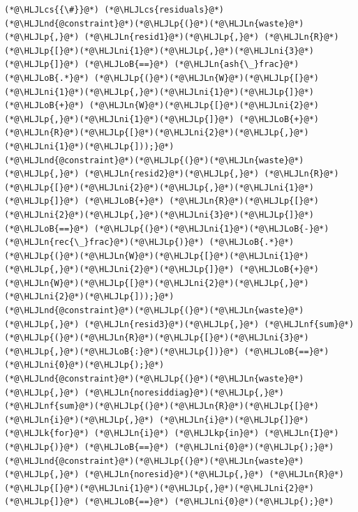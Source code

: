 \documentclass[12pt,a4paper]{article}
\newcommand{\HLJLk}[1]{\textcolor[RGB]{148,91,176}{\textbf{#1}}}
\newcommand{\HLJLkp}[1]{\textcolor[RGB]{148,91,176}{\textbf{#1}}}
\newcommand{\HLJLn}[1]{#1}
\newcommand{\HLJLnd}[1]{\textcolor[RGB]{214,102,97}{#1}}
\newcommand{\HLJLnf}[1]{\textcolor[RGB]{66,102,213}{#1}}
\newcommand{\HLJLni}[1]{\textcolor[RGB]{59,151,46}{#1}}
\newcommand{\HLJLoB}[1]{\textcolor[RGB]{102,102,102}{\textbf{#1}}}
\newcommand{\HLJLp}[1]{#1}
\newcommand{\HLJLcs}[1]{\textcolor[RGB]{153,153,119}{\textit{#1}}}
\begin{document}
\begin{lstlisting}
(*@\HLJLcs{{\#}}@*) (*@\HLJLcs{residuals}@*)
(*@\HLJLnd{@constraint}@*)(*@\HLJLp{(}@*)(*@\HLJLn{waste}@*)(*@\HLJLp{,}@*) (*@\HLJLn{resid1}@*)(*@\HLJLp{,}@*) (*@\HLJLn{R}@*)(*@\HLJLp{[}@*)(*@\HLJLni{1}@*)(*@\HLJLp{,}@*)(*@\HLJLni{3}@*)(*@\HLJLp{]}@*) (*@\HLJLoB{==}@*) (*@\HLJLn{ash{\_}frac}@*) (*@\HLJLoB{.*}@*) (*@\HLJLp{(}@*)(*@\HLJLn{W}@*)(*@\HLJLp{[}@*)(*@\HLJLni{1}@*)(*@\HLJLp{,}@*)(*@\HLJLni{1}@*)(*@\HLJLp{]}@*) (*@\HLJLoB{+}@*) (*@\HLJLn{W}@*)(*@\HLJLp{[}@*)(*@\HLJLni{2}@*)(*@\HLJLp{,}@*)(*@\HLJLni{1}@*)(*@\HLJLp{]}@*) (*@\HLJLoB{+}@*) (*@\HLJLn{R}@*)(*@\HLJLp{[}@*)(*@\HLJLni{2}@*)(*@\HLJLp{,}@*)(*@\HLJLni{1}@*)(*@\HLJLp{]));}@*)
(*@\HLJLnd{@constraint}@*)(*@\HLJLp{(}@*)(*@\HLJLn{waste}@*)(*@\HLJLp{,}@*) (*@\HLJLn{resid2}@*)(*@\HLJLp{,}@*) (*@\HLJLn{R}@*)(*@\HLJLp{[}@*)(*@\HLJLni{2}@*)(*@\HLJLp{,}@*)(*@\HLJLni{1}@*)(*@\HLJLp{]}@*) (*@\HLJLoB{+}@*) (*@\HLJLn{R}@*)(*@\HLJLp{[}@*)(*@\HLJLni{2}@*)(*@\HLJLp{,}@*)(*@\HLJLni{3}@*)(*@\HLJLp{]}@*) (*@\HLJLoB{==}@*) (*@\HLJLp{(}@*)(*@\HLJLni{1}@*)(*@\HLJLoB{-}@*)(*@\HLJLn{rec{\_}frac}@*)(*@\HLJLp{)}@*) (*@\HLJLoB{.*}@*) (*@\HLJLp{(}@*)(*@\HLJLn{W}@*)(*@\HLJLp{[}@*)(*@\HLJLni{1}@*)(*@\HLJLp{,}@*)(*@\HLJLni{2}@*)(*@\HLJLp{]}@*) (*@\HLJLoB{+}@*) (*@\HLJLn{W}@*)(*@\HLJLp{[}@*)(*@\HLJLni{2}@*)(*@\HLJLp{,}@*)(*@\HLJLni{2}@*)(*@\HLJLp{]));}@*)
(*@\HLJLnd{@constraint}@*)(*@\HLJLp{(}@*)(*@\HLJLn{waste}@*)(*@\HLJLp{,}@*) (*@\HLJLn{resid3}@*)(*@\HLJLp{,}@*) (*@\HLJLnf{sum}@*)(*@\HLJLp{(}@*)(*@\HLJLn{R}@*)(*@\HLJLp{[}@*)(*@\HLJLni{3}@*)(*@\HLJLp{,}@*)(*@\HLJLoB{:}@*)(*@\HLJLp{])}@*) (*@\HLJLoB{==}@*) (*@\HLJLni{0}@*)(*@\HLJLp{);}@*)
(*@\HLJLnd{@constraint}@*)(*@\HLJLp{(}@*)(*@\HLJLn{waste}@*)(*@\HLJLp{,}@*) (*@\HLJLn{noresiddiag}@*)(*@\HLJLp{,}@*) (*@\HLJLnf{sum}@*)(*@\HLJLp{(}@*)(*@\HLJLn{R}@*)(*@\HLJLp{[}@*)(*@\HLJLn{i}@*)(*@\HLJLp{,}@*) (*@\HLJLn{i}@*)(*@\HLJLp{]}@*) (*@\HLJLk{for}@*) (*@\HLJLn{i}@*) (*@\HLJLkp{in}@*) (*@\HLJLn{I}@*)(*@\HLJLp{)}@*) (*@\HLJLoB{==}@*) (*@\HLJLni{0}@*)(*@\HLJLp{);}@*)
(*@\HLJLnd{@constraint}@*)(*@\HLJLp{(}@*)(*@\HLJLn{waste}@*)(*@\HLJLp{,}@*) (*@\HLJLn{noresid}@*)(*@\HLJLp{,}@*) (*@\HLJLn{R}@*)(*@\HLJLp{[}@*)(*@\HLJLni{1}@*)(*@\HLJLp{,}@*)(*@\HLJLni{2}@*)(*@\HLJLp{]}@*) (*@\HLJLoB{==}@*) (*@\HLJLni{0}@*)(*@\HLJLp{);}@*)


\end{lstlisting}
\end{document}
